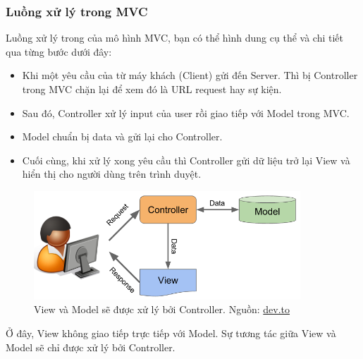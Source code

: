 \subsubsection{Luồng xử lý trong MVC}
Luồng xử lý trong của mô hình MVC, bạn có thể hình dung cụ thể và chi tiết qua từng bước dưới đây:
\begin{itemize}
	\item Khi một yêu cầu của từ máy khách (Client) gửi đến Server. Thì bị Controller trong MVC chặn lại để xem đó là URL request hay sự kiện.
	\item Sau đó, Controller xử lý input của user rồi giao tiếp với Model trong MVC.
	\item Model chuẩn bị data và gửi lại cho Controller.
	\item Cuối cùng, khi xử lý xong yêu cầu thì Controller gửi dữ liệu trở lại View và hiển thị cho người dùng trên trình duyệt.
\end{itemize}
\begin{figure}[H]
	\centering
	\includegraphics[width=10cm]{Images/luongmvc.png}
	\vspace{0.5cm}
	\caption{View và Model sẽ được xử lý bởi Controller. Nguồn: \href{https://dev.to/michellebuchiokonicha/the-model-view-controller-mvc-software-architectural-design-pattern-4jjd}{dev.to}}
	\label{fig:my_label}
\end{figure}

Ở đây, View không giao tiếp trực tiếp với Model. Sự tương tác giữa View và Model sẽ chỉ được xử lý bởi Controller.
